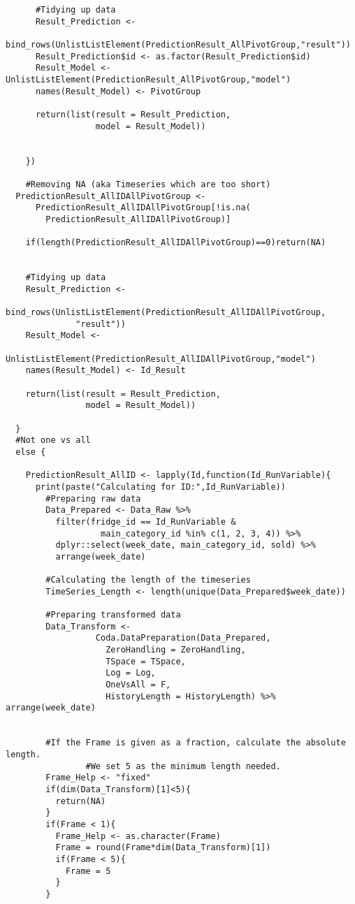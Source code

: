 \begin{verbatim}
      #Tidying up data
      Result_Prediction <- 
			  bind_rows(UnlistListElement(PredictionResult_AllPivotGroup,"result"))
      Result_Prediction$id <- as.factor(Result_Prediction$id)
      Result_Model <- UnlistListElement(PredictionResult_AllPivotGroup,"model")
      names(Result_Model) <- PivotGroup
    
      return(list(result = Result_Prediction,
                  model = Result_Model))
    
      
    })
  
    #Removing NA (aka Timeseries which are too short)
  PredictionResult_AllIDAllPivotGroup <- 
	  PredictionResult_AllIDAllPivotGroup[!is.na(
		PredictionResult_AllIDAllPivotGroup)]
  
    if(length(PredictionResult_AllIDAllPivotGroup)==0)return(NA)
  
  
    #Tidying up data
    Result_Prediction <- 
		  bind_rows(UnlistListElement(PredictionResult_AllIDAllPivotGroup,
			  "result"))
    Result_Model <- 
		  UnlistListElement(PredictionResult_AllIDAllPivotGroup,"model")
    names(Result_Model) <- Id_Result
  
    return(list(result = Result_Prediction,
                model = Result_Model))
    
  }
  #Not one vs all
  else {
    
    PredictionResult_AllID <- lapply(Id,function(Id_RunVariable){
      print(paste("Calculating for ID:",Id_RunVariable))
        #Preparing raw data
        Data_Prepared <- Data_Raw %>%
          filter(fridge_id == Id_RunVariable &
                   main_category_id %in% c(1, 2, 3, 4)) %>%
          dplyr::select(week_date, main_category_id, sold) %>%
          arrange(week_date)
        
        #Calculating the length of the timeseries
        TimeSeries_Length <- length(unique(Data_Prepared$week_date))
        
        #Preparing transformed data
        Data_Transform <- 
				  Coda.DataPreparation(Data_Prepared, 
					ZeroHandling = ZeroHandling,
					TSpace = TSpace, 
					Log = Log,
					OneVsAll = F,
					HistoryLength = HistoryLength) %>% arrange(week_date)
        
        
        #If the Frame is given as a fraction, calculate the absolute length. 
				#We set 5 as the minimum length needed.
        Frame_Help <- "fixed"
        if(dim(Data_Transform)[1]<5){
          return(NA)
        }
        if(Frame < 1){
          Frame_Help <- as.character(Frame)
          Frame = round(Frame*dim(Data_Transform)[1])
          if(Frame < 5){
            Frame = 5
          }
        }
        

\end{verbatim}
